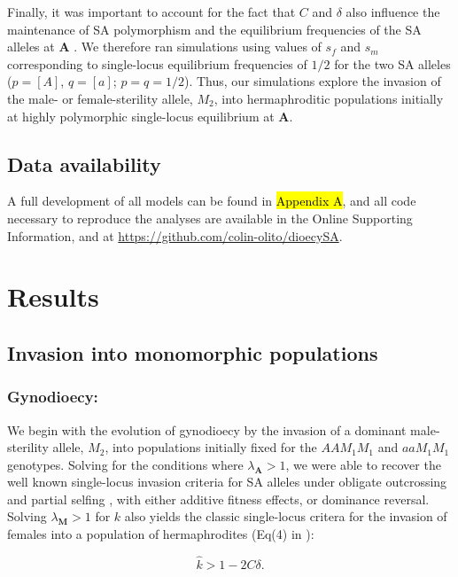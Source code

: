 \documentclass[9pt,twocolumn,twoside,lineno]{gsajnl}
\begin{document}
Finally, it was important to account for the fact that $C$ and $\delta$ also influence the maintenance of SA polymorphism and the equilibrium frequencies of the SA alleles at $\mathbf{A}$ \citep{JordanConnallon2014,Olito2017}. We therefore ran simulations using values of $s_f$ and $s_m$ corresponding to single-locus equilibrium frequencies of $1/2$ for the two SA alleles ($p = [A]$, $q = [a]$; $p=q=1/2$). Thus, our simulations explore the invasion of the male- or female-sterility allele, $M_2$, into hermaphroditic populations initially at highly polymorphic single-locus equilibrium at $\mathbf{A}$.


\subsection{Data availability}
A full development of all models can be found in \hl{Appendix A}, and all code necessary to reproduce the analyses are available in the Online Supporting Information, and at \url{https://github.com/colin-olito/dioecySA}.


\section{Results}

\subsection{Invasion into monomorphic populations}

\subsubsection{Gynodioecy:} We begin with the evolution of gynodioecy by the invasion of a dominant male-sterility allele, $M_2$, into populations initially fixed for the $AAM_1M_1$ and $aaM_1M_1$ genotypes. Solving for the conditions where $\lambda_{\mathbf{A}} > 1$, we were able to recover the well known single-locus invasion criteria for SA alleles under obligate outcrossing \citep{Kidwell1977} and partial selfing \citep{JordanConnallon2014,Olito2017}, with either additive fitness effects, or dominance reversal. Solving $\lambda_{\mathbf{M}} > 1$ for $k$ also yields the classic single-locus critera for the invasion of females into a population of hermaphrodites (Eq(4) in \citealt{Charlesworth1978a}):

\begin{equation}\label{eq:1LocGyn}
	\hat{k} > 1 - 2 C \delta.
\end{equation}
\end{document}
